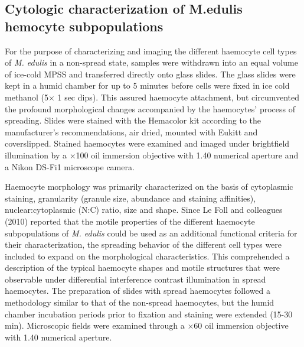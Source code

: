 \subsection{Cytologic characterization of M.edulis hemocyte subpopulations}
\label{subsection:morph}
For the purpose of characterizing and imaging the different haemocyte cell types of \emph{M. edulis} in a non-spread state, samples were withdrawn into an equal volume of ice-cold MPSS and transferred directly onto glass slides. The glass slides were kept in a humid chamber for up to 5 minutes before cells were fixed in ice cold methanol (5$\times$ 1 sec dips). This assured haemocyte attachment, but circumvented the profound morphological changes accompanied by the haemocytes’ process of spreading. Slides were stained with the Hemacolor\textsuperscript{\textregistered} kit according to the manufacturer’s recommendations, air dried, mounted with Eukitt\textsuperscript{\textregistered} and coverslipped. Stained haemocytes were examined and imaged under brightfield illumination by a $\times$100 oil immersion objective with 1.40 numerical aperture and a Nikon DS-Fi1 microscope camera.

Haemocyte morphology was primarily characterized on the basis of cytoplasmic staining, granularity (granule size, abundance and staining affinities), nuclear:cytoplasmic (N:C) ratio, size and shape. Since Le Foll and colleagues (2010) reported that the motile properties of the different haemocyte subpopulations of \emph{M. edulis} could be used as an additional functional criteria for their characterization, the spreading behavior of the different cell types were included to expand on the morphological characteristics. This comprehended a description of the typical haemocyte shapes and motile structures that were observable under differential interference contrast illumination in spread haemocytes. The preparation of slides with spread haemocytes followed a methodology similar to that of the non-spread haemocytes, but the humid chamber incubation periods prior to fixation and staining were extended (15-30 min). Microscopic fields were examined through a $\times$60 oil immersion objective with 1.40 numerical aperture.

